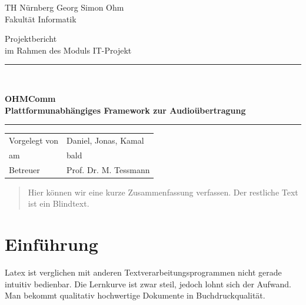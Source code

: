 \documentclass[11pt,a4paper]{report}
\begin{document}
\begin{titlepage}
  \begin{center}
    \parbox[t]{8cm}{
      TH Nürnberg Georg Simon Ohm\\
      Fakultät Informatik \\
	}
    \vfill    
    {\LARGE Projektbericht} \\[0.5cm]
    {\large im Rahmen des Moduls IT-Projekt} \\[5mm]
    \rule{\textwidth}{1pt}\\[0.5cm]
    {\begin{spacing}{1.15} \huge \bfseries OHMComm \\Plattformunabhängiges Framework zur Audioübertragung \\ \end{spacing}}
    \rule{\textwidth}{1pt}    
    \vfill    
    \begin{tabular}{ll} %
      Vorgelegt von & Daniel, Jonas, Kamal \\
      am & bald \\
      Betreuer & Prof. Dr. M. Tessmann \\
    \end{tabular}    
    \vfill
\end{center}
\end{titlepage}
\cleardoublepage

\begin{abstract} 
Hier können wir eine kurze Zusammenfassung verfassen. Der restliche Text ist ein Blindtext. \blindtext
\end{abstract}

\tableofcontents


\chapter{Einführung} \label{chap:einf}

Latex ist verglichen mit anderen Textverarbeitungsprogrammen nicht gerade intuitiv bedienbar. Die Lernkurve ist zwar steil, jedoch lohnt sich der Aufwand. Man bekommt qualitativ hochwertige Dokumente in Buchdruckqualität.
\
\end{document}
